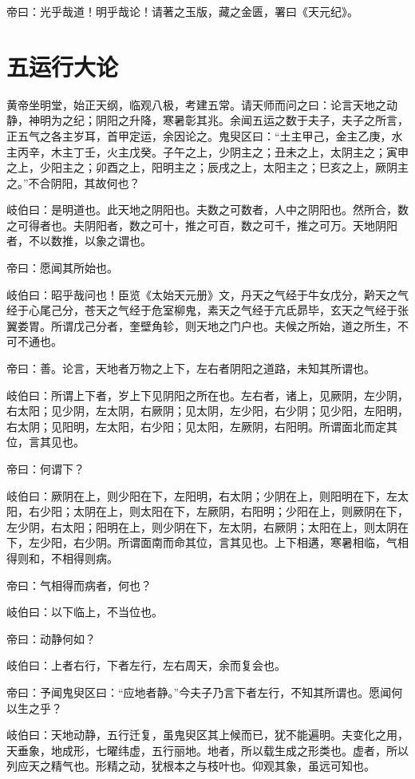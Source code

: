 \documentclass{article}%
\begin{document}
帝曰：光乎哉道！明乎哉论！请著之玉版，藏之金匮，署曰《天元纪》。
\section{五运行大论}
黄帝坐明堂，始正天纲，临观八极，考建五常。请天师而问之曰：论言天地之动静，神明为之纪；阴阳之升降，寒暑彰其兆。余闻五运之数于夫子，夫子之所言，正五气之各主岁耳，首甲定运，余因论之。鬼臾区曰：“土主甲己，金主乙庚，水主丙辛，木主丁壬，火主戊癸。子午之上，少阴主之；丑未之上，太阴主之；寅申之上，少阳主之；卯酉之上，阳明主之；辰戌之上，太阳主之；巳亥之上，厥阴主之。”不合阴阳，其故何也？

岐伯曰：是明道也。此天地之阴阳也。夫数之可数者，人中之阴阳也。然所合，数之可得者也。夫阴阳者，数之可十，推之可百，数之可千，推之可万。天地阴阳者，不以数推，以象之谓也。

帝曰：愿闻其所始也。

岐伯曰：昭乎哉问也！臣览《太始天元册》文，丹天之气经于牛女戊分，黅天之气经于心尾己分，苍天之气经于危室柳鬼，素天之气经于亢氐昴毕，玄天之气经于张翼娄胃。所谓戊己分者，奎壁角轸，则天地之门户也。夫候之所始，道之所生，不可不通也。

帝曰：善。论言，天地者万物之上下，左右者阴阳之道路，未知其所谓也。

岐伯曰：所谓上下者，岁上下见阴阳之所在也。左右者，诸上，见厥阴，左少阴，右太阳；见少阴，左太阴，右厥阴；见太阴，左少阳，右少阴；见少阳，左阳明，右太阴；见阳明，左太阳，右少阳；见太阳，左厥阴，右阳明。所谓面北而定其位，言其见也。

帝曰：何谓下？

岐伯曰：厥阴在上，则少阳在下，左阳明，右太阴；少阴在上，则阳明在下，左太阳，右少阳；太阴在上，则太阳在下，左厥阴，右阳明；少阳在上，则厥阴在下，左少阴，右太阳；阳明在上，则少阴在下，左太阴，右厥阴；太阳在上，则太阴在下，左少阳，右少阴。所谓面南而命其位，言其见也。上下相遘，寒暑相临，气相得则和，不相得则病。

帝曰：气相得而病者，何也？

岐伯曰：以下临上，不当位也。

帝曰：动静何如？

岐伯曰：上者右行，下者左行，左右周天，余而复会也。

帝曰：予闻鬼臾区曰：“应地者静。”今夫子乃言下者左行，不知其所谓也。愿闻何以生之乎？

岐伯曰：天地动静，五行迁复，虽鬼臾区其上候而已，犹不能遍明。夫变化之用，天垂象，地成形，七曜纬虚，五行丽地。地者，所以载生成之形类也。虚者，所以列应天之精气也。形精之动，犹根本之与枝叶也。仰观其象，虽远可知也。
\end{document}
